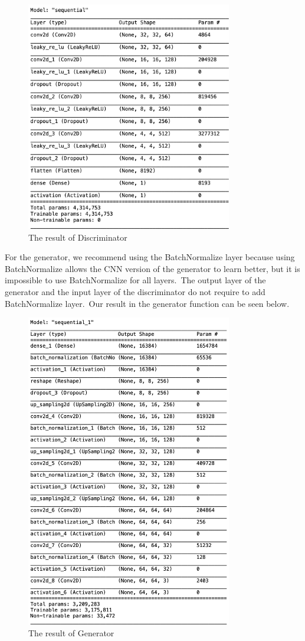 \documentclass[conference]{IEEEtran}
\begin{document}
    \begin{figure}
        \caption{The result of Discriminator}
        \label{fig:discriminator}
        \includegraphics[width=9cm]{discriminator.png}
        \centering
    \end{figure}

    For the generator, we recommend using the BatchNormalize layer because using BatchNormalize allows the CNN version of the generator to learn better, but it is impossible to use BatchNormalize for all layers.\ The output layer of the generator and the input layer of the discriminator do not require to add BatchNormalize layer.\ Our result in the generator function can be seen below.

    \begin{figure}
        \caption{The result of Generator}
        \label{fig:generator}
        \includegraphics[width=9cm]{generator.png}
    \end{figure}
\end{document}

